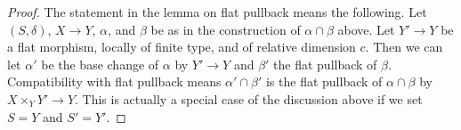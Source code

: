 \documentclass{stacks-project}
\theoremstyle{plain}
\theoremstyle{definition}
\theoremstyle{remark}
\numberwithin{equation}{subsection}
\begin{document}
\begin{proof}
\medskip\noindent
The statement in the lemma on flat pullback means the following.
Let $(S, \delta)$, $X \to Y$, $\alpha$, and $\beta$ be as in the
construction of $\alpha \cap \beta$ above. Let $Y' \to Y$ be a flat
morphism, locally of finite type, and of relative dimension $c$. Then
we can let $\alpha'$ be the base change of $\alpha$ by $Y' \to Y$
and $\beta'$ the flat pullback of $\beta$. Compatibility with flat
pullback means $\alpha' \cap \beta'$ is the flat pullback of
$\alpha \cap \beta$ by $X \times_Y Y' \to Y$. This is actually
a special case of the discussion above if we set $S = Y$ and $S' = Y'$.
\end{proof}
\end{document}

